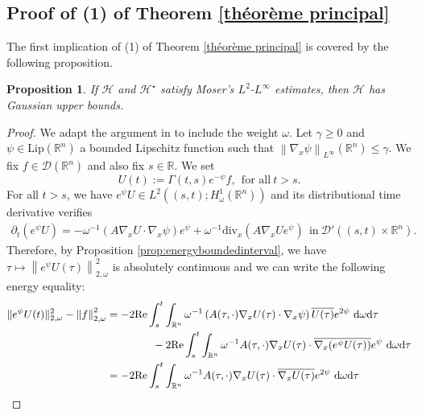 \documentclass[12pt, letterpaper]{amsart}
\newtheorem{prop}[thm]{Proposition}
\theoremstyle{definition}
\theoremstyle{remark}
\numberwithin{equation}{section}
\begin{document}
\subsection{Proof of (1) of Theorem \ref{théorème principal}}
The first implication of (1) of Theorem \ref{théorème principal} is covered by the following proposition.
\begin{prop}\label{ThmHkIM}
    If $\mathcal{H}$ and $\mathcal{H}^\star$ satisfy Moser's $L^2$-$L^\infty$ estimates, then $\mathcal{H}$ has Gaussian upper bounds. 
\end{prop}
\begin{proof}
We adapt the argument in \cite{hofmann2004gaussian} to include the weight $\omega$. Let $\gamma \geq0$ and $\psi \in \mathrm{Lip}(\mathbb{R}^n)$ a bounded Lipschitz function such that $\left \| \nabla_x \psi \right \|_{L^\infty}(\mathbb{R}^n) \leq \gamma.$ We fix $f \in \mathcal{D}(\mathbb{R}^n)$ and also fix $s \in \mathbb{R}$. We set 
\begin{equation*}
    U(t):=\Gamma(t,s)e^{-\psi}f, \ \ \text{for all} \ t>s.
\end{equation*}
For all $t>s$, we have $e^{\psi}U \in L^2((s,t);H^1_\omega (\mathbb{R}^n))$ and its distributional time derivative verifies
\begin{align*}
    \partial_t(e^{\psi}U) = -\omega^{-1}\left ( A \nabla_x U \cdot \nabla_x \psi \right ) e^{\psi}+\omega^{-1} \mathrm{div}_x(A \nabla_x U e^{\psi}) \ \ \mathrm{in} \ \mathcal{D'}((s,t)\times \mathbb{R}^n).
\end{align*}
Therefore, by Proposition \ref{prop:energyboundedinterval}, we have $ \tau \mapsto \left \| e^{\psi} U(\tau) \right \|^2_{2,\omega}$ is absolutely continuous and we can write the following energy equality:
\begin{align*}
     \|e^{\psi}U(t)   \|^2_{2,\omega}-\left \|f  \right \|^2_{2,\omega}&= -2\mathrm{Re}\int_{s}^{t} \int_{\mathbb{R}^n} \omega^{-1}\left (  A(\tau,\cdot)\nabla_x U(\tau)\cdot \nabla_x \psi \right )  \overline{U(\tau)}   e^{2\psi} \ \mathrm d \omega \mathrm d \tau \\&
     \hspace{1.5cm} -2\mathrm{Re}\int_{s}^{t} \int_{\mathbb{R}^n} \omega^{-1}A(\tau,\cdot)\nabla_x U(\tau)\cdot \overline{\nabla_x (e^\psi U(\tau))}  e^{\psi} \ \mathrm d \omega \mathrm d \tau
    \\&= -2\mathrm{Re}\int_{s}^{t} \int_{\mathbb{R}^n} \omega^{-1}A(\tau,\cdot)\nabla_x U(\tau)\cdot \overline{\nabla_x U(\tau)}e^{2\psi} \ \mathrm d \omega \mathrm d \tau 

\end{align*}
\end{proof}
\end{document}
